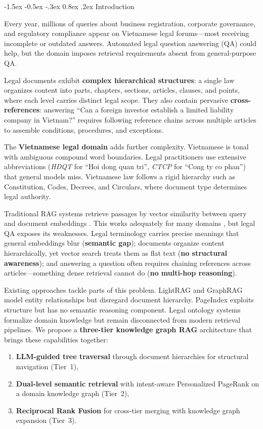 \documentclass{IOS-Book-Article}
\makeatletter
\renewcommand\section{\@startsection{section}{1}{\z@}%
  {-1.5ex \@plus -0.5ex \@minus -.3ex}%
  {0.8ex \@plus .2ex}%
  {\normalfont\large\bfseries}}
\makeatother
\begin{document}
\section{Introduction}

Every year, millions of queries about business registration, corporate governance, and regulatory compliance appear on Vietnamese legal forums---most receiving incomplete or outdated answers. Automated legal question answering (QA) could help, but the domain imposes retrieval requirements absent from general-purpose QA.

Legal documents exhibit \textbf{complex hierarchical structures}: a single law organizes content into parts, chapters, sections, articles, clauses, and points, where each level carries distinct legal scope. They also contain pervasive \textbf{cross-references}: answering ``Can a foreign investor establish a limited liability company in Vietnam?'' requires following reference chains across multiple articles to assemble conditions, procedures, and exceptions.

The \textbf{Vietnamese legal domain} adds further complexity. Vietnamese is tonal with ambiguous compound word boundaries. Legal practitioners use extensive abbreviations (\textit{HDQT} for ``Hoi dong quan tri'', \textit{CTCP} for ``Cong ty co phan'') that general models miss. Vietnamese law follows a rigid hierarchy such as Constitution, Codes, Decrees, and Circulars, where document type determines legal authority.

Traditional RAG systems \cite{r1} retrieve passages by vector similarity between query and document embeddings \cite{r2}. This works adequately for many domains \cite{r3,r4}, but legal QA exposes its weaknesses. Legal terminology carries precise meanings that general embeddings blur (\textbf{semantic gap}); documents organize content hierarchically, yet vector search treats them as flat text (\textbf{no structural awareness}); and answering a question often requires chaining references across articles---something dense retrieval cannot do (\textbf{no multi-hop reasoning}).

Existing approaches tackle parts of this problem. LightRAG \cite{r5} and GraphRAG \cite{r6} model entity relationships but disregard document hierarchy. PageIndex \cite{r7} exploits structure but has no semantic reasoning component. Legal ontology systems \cite{r8,r9} formalize domain knowledge but remain disconnected from modern retrieval pipelines. We propose a \textbf{three-tier knowledge graph RAG} architecture that brings these capabilities together:
\begin{enumerate}
\item \textbf{LLM-guided tree traversal} through document hierarchies for structural navigation (Tier~1),
\item \textbf{Dual-level semantic retrieval} with intent-aware Personalized PageRank on a domain knowledge graph (Tier~2),
\item \textbf{Reciprocal Rank Fusion} for cross-tier merging with knowledge graph expansion (Tier~3).
\end{enumerate}
\end{document}
